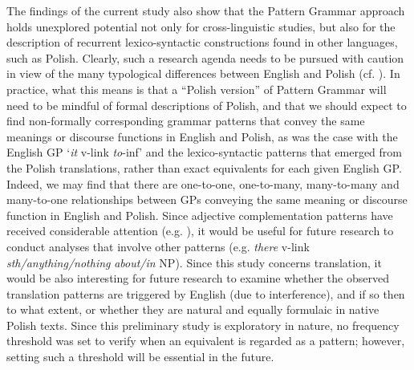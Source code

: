 \documentclass[output=paper]{langscibook}
\begin{document}
The findings of the current study also show that the Pattern Grammar approach holds unexplored potential not only for cross-linguistic studies, but also for the description of recurrent lexico-syntactic constructions found in other languages, such as Polish. Clearly, such a research agenda needs to be pursued with caution in view of the many typological differences between English and Polish (cf. \citealt{FisiakEtAl1978, WillimMańczak-Wohlfeld1997}). In practice, what this means is that a “Polish version” of Pattern Grammar will need to be mindful of formal descriptions of Polish, and that we should expect to find non-formally corresponding grammar patterns that convey the same meanings or discourse functions in English and Polish, as was the case with the English GP ‘\textit{it} v-link {\ADJ} \textit{to}{}-inf’ and the lexico-syntactic patterns that emerged from the Polish translations, rather than exact equivalents for each given English GP. Indeed, we may find that there are one-to-one, one-to-many, many-to-many and many-to-one relationships between GPs conveying the same meaning or discourse function in English and Polish. Since adjective complementation patterns have received considerable attention (e.g. \citealt{SuHunston2019}), it would be useful for future research to conduct analyses that involve other patterns (e.g. \textit{there} v-link \textit{sth/anything/nothing} {\ADJ} \textit{about/in} NP). Since this study concerns translation, it would be also interesting for future research to examine whether the observed translation patterns are triggered by English (due to interference), and if so then to what extent, or whether they are natural and equally formulaic in native Polish texts. Since this preliminary study is exploratory in nature, no frequency threshold was set to verify when an equivalent is regarded as a pattern; however, setting such a threshold will be essential in the future. 
\end{document}
